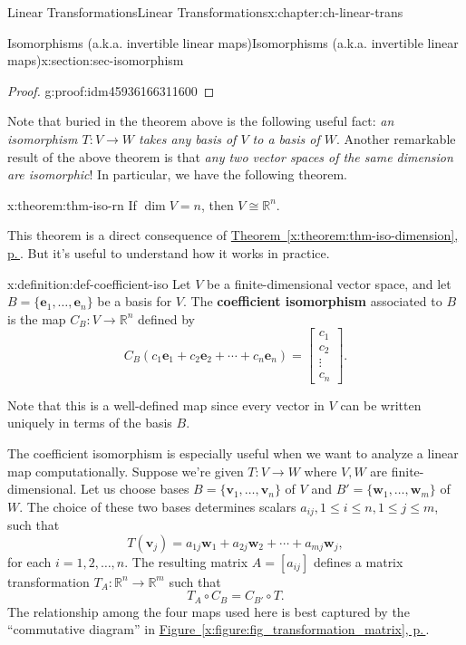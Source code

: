 \documentclass[oneside,10pt,]{book}
\newcommand{\xreffont}{\relax}
\newcommand{\terminology}[1]{\textbf{#1}}
\numberwithin{equation}{section}
\newcommand{\bbm}{\begin{bmatrix}}
\newcommand{\ebm}{\end{bmatrix}}
\newcommand{\R}{\mathbb{R}}
\newcommand{\vv}{\mathbf{v}}
\newcommand{\ww}{\mathbf{w}}
\begin{document}
\begin{chapterptx}{Linear Transformations}{}{Linear Transformations}{}{}{x:chapter:ch-linear-trans}
\begin{sectionptx}{Isomorphisms (a.k.a. invertible linear maps)}{}{Isomorphisms (a.k.a. invertible linear maps)}{}{}{x:section:sec-isomorphism}
\begin{proof}{}{g:proof:idm45936166311600}
\end{proof}
Note that buried in the theorem above is the following useful fact: \emph{an isomorphism \(T:V\to W\) takes any basis of \(V\) to a basis of \(W\)}. Another remarkable result of the above theorem is that \emph{any two vector spaces of the same dimension are isomorphic}! In particular, we have the following theorem.%
\begin{theorem}{}{}{x:theorem:thm-iso-rn}%
If \(\dim V=n\), then \(V\cong \R^n\).%
\end{theorem}
This theorem is a direct consequence of \hyperref[x:theorem:thm-iso-dimension]{Theorem~{\xreffont\ref{x:theorem:thm-iso-dimension}}, p.\,\pageref{x:theorem:thm-iso-dimension}}. But it's useful to understand how it works in practice.%
\begin{definition}{}{x:definition:def-coefficient-iso}%
Let \(V\) be a finite-dimensional vector space, and let \(B=\{\mathbf{e}_1,\ldots, \mathbf{e}_n\}\) be a basis for \(V\). The \terminology{coefficient isomorphism} associated to \(B\) is the map \(C_B:V\to \R^n\) defined by%
\begin{equation*}
C_B(c_1\mathbf{e}_1+c_2\mathbf{e}_2+\cdots +c_n\mathbf{e}_n)=\bbm c_1\\c_2\\\vdots \\c_n\ebm\text{.}
\end{equation*}
%
\end{definition}
Note that this is a well-defined map since every vector in \(V\) can be written uniquely in terms of the basis \(B\).%
\par
The coefficient isomorphism is especially useful when we want to analyze a linear map computationally. Suppose we're given \(T:V\to W\) where \(V, W\) are finite-dimensional. Let us choose bases \(B=\{\vv_1,\ldots, \vv_n\}\) of \(V\) and \(B' = \{\ww_1,\ldots, \ww_m\}\) of \(W\). The choice of these two bases determines scalars \(a_{ij}, 1\leq i\leq n, 1\leq j\leq m\), such that%
\begin{equation*}
T(\vv_j) = a_{1j}\ww_1+a_{2j}\ww_2+\cdots + a_{mj}\ww_j,
\end{equation*}
for each \(i=1,2,\ldots, n\). The resulting matrix \(A=[a_{ij}]\) defines a matrix transformation \(T_A:\R^n\to \R^m\) such that%
\begin{equation*}
T_A\circ C_B = C_{B'}\circ T\text{.}
\end{equation*}
The relationship among the four maps used here is best captured by the ``commutative diagram'' in \hyperref[x:figure:fig_transformation_matrix]{Figure~{\xreffont\ref{x:figure:fig_transformation_matrix}}, p.\,\pageref{x:figure:fig_transformation_matrix}}.%

\end{sectionptx}
\end{chapterptx}
\end{document}
